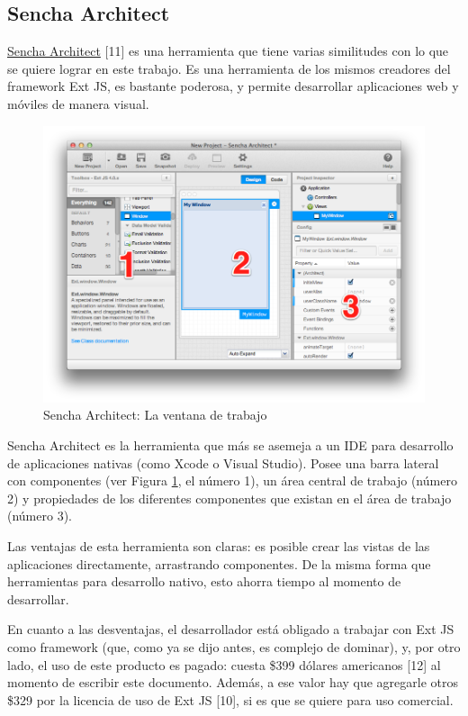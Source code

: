 \documentclass[12pt,spanish,letter]{report}
\makeatletter
\def\maxwidth{\ifdim\Gin@nat@width>\linewidth\linewidth
\else\Gin@nat@width\fi}
\let\Oldincludegraphics\includegraphics
\renewcommand{\includegraphics}[1]{\Oldincludegraphics[width=\maxwidth]{#1}}
\makeatother
\begin{document}
\subsection{Sencha Architect}

\href{http://www.sencha.com/products/architect}{Sencha Architect}
{[}11{]} es una herramienta que tiene varias similitudes con lo que se
quiere lograr en este trabajo. Es una herramienta de los mismos
creadores del framework Ext JS, es bastante poderosa, y permite
desarrollar aplicaciones web y móviles de manera visual.

\begin{figure}[htbp]
\centering
\includegraphics{figures/sencha-architect-big.png}
\caption{Sencha Architect: La ventana de trabajo
\label{figure:sencha-architect}}
\end{figure}

Sencha Architect es la herramienta que más se asemeja a un IDE para
desarrollo de aplicaciones nativas (como Xcode o Visual Studio). Posee
una barra lateral con componentes (ver Figura
\ref{figure:sencha-architect}, el número 1), un área central de trabajo
(número 2) y propiedades de los diferentes componentes que existan en el
área de trabajo (número 3).

Las ventajas de esta herramienta son claras: es posible crear las vistas
de las aplicaciones directamente, arrastrando componentes. De la misma
forma que herramientas para desarrollo nativo, esto ahorra tiempo al
momento de desarrollar.

En cuanto a las desventajas, el desarrollador está obligado a trabajar
con Ext JS como framework (que, como ya se dijo antes, es complejo de
dominar), y, por otro lado, el uso de este producto es pagado: cuesta
\$399 dólares americanos {[}12{]} al momento de escribir este documento.
Además, a ese valor hay que agregarle otros \$329 por la licencia de uso
de Ext JS {[}10{]}, si es que se quiere para uso comercial.
\end{document}
